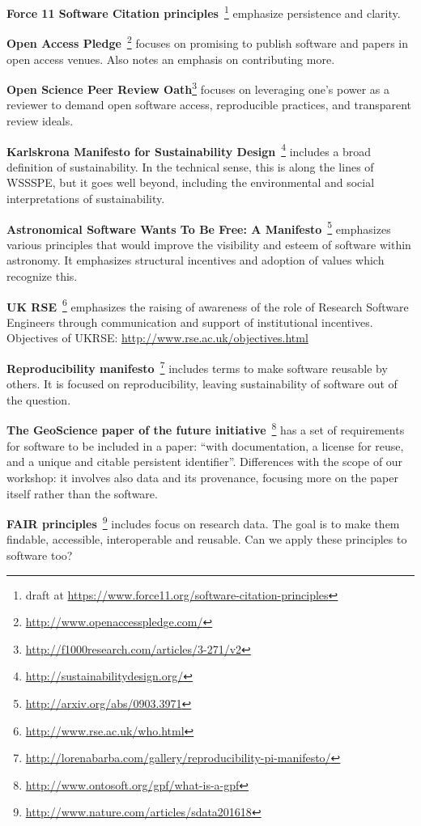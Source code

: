 \documentclass[a4paper,UKenglish]{dagman}
\newcommand{\manifesto}[1]{{\bf #1}\xspace}
\begin{document}
\begin{appendix}
\manifesto{Force 11 Software Citation principles}~\cite{arfon_m._smith_software_2016}\footnote{draft at 
\url{https://www.force11.org/software-citation-principles}}
emphasize persistence and clarity.

\manifesto{Open Access Pledge}~\cite{alex_holcombe_open_2011}\footnote{\url{http://www.openaccesspledge.com/}}
focuses on promising to publish software and papers in open access venues.
Also notes an emphasis on contributing more.

\manifesto{Open Science Peer Review Oath}\footnote{\url{http://f1000research.com/articles/3-271/v2}}
focuses on leveraging one's power as a reviewer to demand open software access, reproducible practices, and transparent review ideals.

\manifesto{Karlskrona Manifesto for Sustainability Design}~\cite{becker_karlskrona_2014}\footnote{\url{http://sustainabilitydesign.org/}}
includes a broad definition of sustainability. In the technical sense, this is along the lines of WSSSPE, but it goes well beyond, including the environmental and social interpretations of sustainability.

\manifesto{Astronomical Software Wants To Be Free: A Manifesto}~\cite{weiner_astronomical_2009}\footnote{\url{http://arxiv.org/abs/0903.3971}}
emphasizes various principles that would improve the visibility and esteem of software within astronomy. It emphasizes structural incentives and adoption of values which recognize this. 

\manifesto{UK RSE}~\cite{rse_conference_2016_what_2016}\footnote{\url{http://www.rse.ac.uk/who.html}}
emphasizes the raising of awareness of the role of Research Software Engineers through communication and support of institutional incentives.
Objectives of UKRSE: \url{http://www.rse.ac.uk/objectives.html}

\manifesto{Reproducibility manifesto}~\cite{barba_reproducibility_2012}\footnote{\url{http://lorenabarba.com/gallery/reproducibility-pi-manifesto/}}
includes terms to make software reusable by others. It is focused on reproducibility, leaving sustainability of software out of the question.

\manifesto{The GeoScience paper of the future initiative}~\cite{onto_soft_what_2016}\footnote{\url{http://www.ontosoft.org/gpf/what-is-a-gpf}}
has a set of requirements for software to be included in a paper: ``with documentation, a license for reuse, and a unique and citable persistent identifier''. Differences with the scope of our workshop: it involves also data and its provenance, focusing more on the paper itself rather than the software.

\manifesto{FAIR principles}~\cite{wilkinson_fair_2016}\footnote{\url{http://www.nature.com/articles/sdata201618}}
includes focus on research data. The goal is to make them findable, accessible, interoperable and reusable. Can we apply these principles to software too?


% 



\end{appendix}
\end{document}
